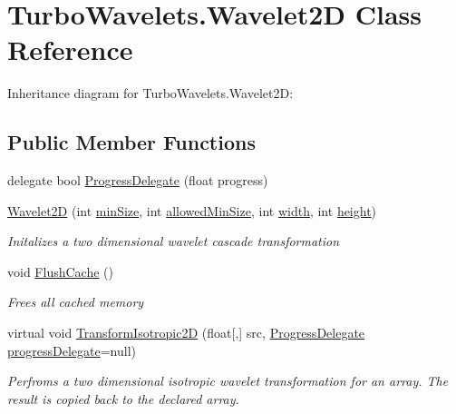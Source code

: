 \hypertarget{class_turbo_wavelets_1_1_wavelet2_d}{\section{Turbo\+Wavelets.\+Wavelet2\+D Class Reference}
\label{class_turbo_wavelets_1_1_wavelet2_d}
}


Inheritance diagram for Turbo\+Wavelets.\+Wavelet2\+D\+:
\subsection*{Public Member Functions}
\begin{DoxyCompactItemize}
\item 
delegate bool \hyperlink{class_turbo_wavelets_1_1_wavelet2_d_aec52fe74aa08e073119064ef4ac3fe93}{Progress\+Delegate} (float progress)
\item 
\hyperlink{class_turbo_wavelets_1_1_wavelet2_d_a5156da3a3376121d64967dd8cd75725b}{Wavelet2\+D} (int \hyperlink{class_turbo_wavelets_1_1_wavelet2_d_af5148ef1a46dd5694ccea13aa8f1b9e2}{min\+Size}, int \hyperlink{class_turbo_wavelets_1_1_wavelet2_d_a949bac2b4f540092cf7cc8916968cdc0}{allowed\+Min\+Size}, int \hyperlink{class_turbo_wavelets_1_1_wavelet2_d_aaa4b3711957fe1798980e6891331a08d}{width}, int \hyperlink{class_turbo_wavelets_1_1_wavelet2_d_afb2aa87b89b82f329357cbdc0cde18a8}{height})
\begin{DoxyCompactList}\small\item\em Initalizes a two dimensional wavelet cascade transformation \end{DoxyCompactList}\item 
void \hyperlink{class_turbo_wavelets_1_1_wavelet2_d_a727e557f207cf861b10c38f1f1a91b52}{Flush\+Cache} ()
\begin{DoxyCompactList}\small\item\em Frees all cached memory \end{DoxyCompactList}\item 
virtual void \hyperlink{class_turbo_wavelets_1_1_wavelet2_d_ac647a989c2b66ca08a8b7e4196cbc547}{Transform\+Isotropic2\+D} (float\mbox{[},\mbox{]} src, \hyperlink{class_turbo_wavelets_1_1_wavelet2_d_aec52fe74aa08e073119064ef4ac3fe93}{Progress\+Delegate} \hyperlink{class_turbo_wavelets_1_1_wavelet2_d_a41d9135f22a6b2cb661b2cc2ccb768ff}{progress\+Delegate}=null)
\begin{DoxyCompactList}\small\item\em Perfroms a two dimensional isotropic wavelet transformation for an array. The result is copied back to the declared array. \end{DoxyCompactList}\item 

\end{DoxyCompactItemize}
